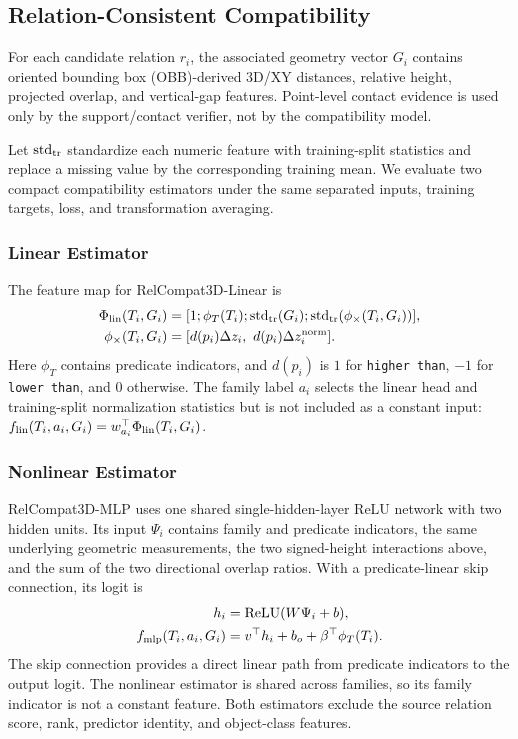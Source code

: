 \subsection{Relation-Consistent Compatibility}
\label{sec:Compatibility}
For each candidate relation $r_i$, the associated geometry vector $G_i$ contains oriented bounding box (OBB)-derived 3D/XY distances, relative height, projected overlap, and vertical-gap features. Point-level contact evidence is used only by the support/contact verifier, not by the compatibility model. 

Let $\operatorname{std}_{\rm tr}$ standardize each numeric feature with training-split statistics and replace a missing value by the corresponding training mean. We evaluate two compact compatibility estimators under the same separated inputs, training targets, loss, and transformation averaging. 
\subsubsection{Linear Estimator}
The feature map for RelCompat3D-Linear is 
\begin{equation}
\begin{aligned}
\Phi_{\rm lin}(T_i,G_i)&=[1;\phi_T(T_i);\operatorname{std}_{\rm tr}(G_i);
\operatorname{std}_{\rm tr}(\phi_{\times}(T_i,G_i))],\\
\phi_{\times}(T_i,G_i)&=
[d(p_i)\Delta z_i,\ d(p_i)\Delta z_i^{\rm norm}].
\end{aligned}
\end{equation}
Here $\phi_T$ contains predicate indicators, and $d(p_i)$ is $1$ for \texttt{higher than}, $-1$ for \texttt{lower than}, and $0$ otherwise. The family label $a_i$ selects the linear head and training-split normalization statistics but is not included as a constant input: $f_{\rm lin}(T_i,a_i,G_i)=w_{a_i}^\top\Phi_{\rm lin}(T_i,G_i)$.

\subsubsection{Nonlinear Estimator}
RelCompat3D-MLP uses one shared single-hidden-layer ReLU network with two hidden units. Its input $\Psi_i$ contains family and predicate indicators, the same underlying geometric measurements, the two signed-height interactions above, and the sum of the two directional overlap ratios. With a predicate-linear skip connection, its logit is
\begin{equation}
\begin{aligned}
h_i&=\operatorname{ReLU}(W\Psi_i+b),\\
f_{\rm mlp}(T_i,a_i,G_i)&=v^\top h_i+b_o+
\beta^\top\phi_T(T_i).
\end{aligned}
\end{equation}
The skip connection provides a direct linear path from predicate indicators to the output logit. The nonlinear estimator is shared across families, so its family indicator is not a constant feature. Both estimators exclude the source relation score, rank, predictor identity, and object-class features.

